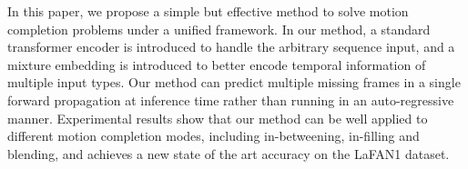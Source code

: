\documentclass[10pt,twocolumn,letterpaper]{article}
\begin{document}
In this paper, we propose a simple but effective method to solve motion completion problems under a unified framework. In our method, a standard transformer encoder is introduced to handle the arbitrary sequence input, and a mixture embedding is introduced to better encode temporal information of multiple input types. Our method can predict multiple missing frames in a single forward propagation at inference time rather than running in an auto-regressive manner. Experimental results show that our method can be well applied to different motion completion modes, including in-betweening, in-filling and blending, and achieves a new state of the art accuracy on the LaFAN1 dataset.


{\small


}
\end{document}
